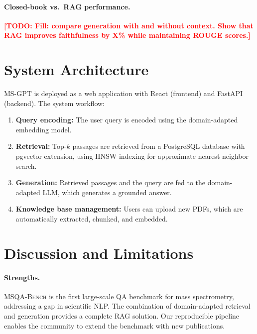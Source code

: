 \documentclass[11pt]{article}
\newcommand{\msgpt}{\textsc{MS-GPT}}
\newcommand{\msqa}{\textsc{MSQA-Bench}}
\newcommand{\todo}[1]{\textcolor{red}{\textbf{[TODO: #1]}}}
\begin{document}
\paragraph{Closed-book vs.\ RAG performance.}
\todo{Fill: compare generation with and without context. Show that RAG
improves faithfulness by X\% while maintaining ROUGE scores.}


\section{System Architecture}
\label{sec:system}

\msgpt{} is deployed as a web application with React (frontend) and FastAPI
(backend). The system workflow:

\begin{enumerate}[leftmargin=*,itemsep=1pt]
    \item \textbf{Query encoding:} The user query is encoded using the
    domain-adapted embedding model.
    \item \textbf{Retrieval:} Top-$k$ passages are retrieved from a PostgreSQL
    database with pgvector extension, using HNSW indexing for approximate
    nearest neighbor search.
    \item \textbf{Generation:} Retrieved passages and the query are fed to the
    domain-adapted LLM, which generates a grounded answer.
    \item \textbf{Knowledge base management:} Users can upload new PDFs, which
    are automatically extracted, chunked, and embedded.
\end{enumerate}


\section{Discussion and Limitations}
\label{sec:discussion}

\paragraph{Strengths.}
\msqa{} is the first large-scale QA benchmark for mass spectrometry,
addressing a gap in scientific NLP. The combination of domain-adapted
retrieval and generation provides a complete RAG solution. Our reproducible
pipeline enables the community to extend the benchmark with new publications.
\end{document}
